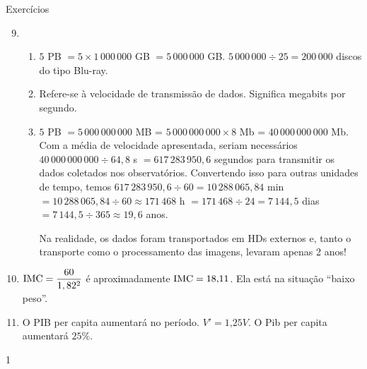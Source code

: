 \begin{answer}{Exercícios}
{\exerciselist
\begin{enumerate}\setcounter{enumi}{8}
\item 
\begin{enumerate}
\item \(5\) PB \(= 5\times 1\,000\,000\) GB \(= 5\,000\,000\) GB. \(5\,000\,000 \div 25 = 200\,000\) discos do tipo Blu-ray.

\item Refere-se à velocidade de transmissão de dados. Significa megabits por segundo.

\item \(5\) PB \(=5\,000\,000\,000\) MB = \(5\,000\,000\,000 \times 8\) Mb = \(40\,000\,000\,000\) Mb. Com a média de velocidade apresentada, seriam necessários \(40\,000\,000\,000 \div 64,8\) s \(= 617\,283\,950,6\) segundos para transmitir os dados coletados nos observatórios. Convertendo isso para outras unidades de tempo, temos \(617\,283\,950,6 \div 60 = 10\,288\,065,84\) min \(= 10\,288\,065,84 \div 60 \approx 171\,468\) h \(= 171\,468 \div 24 = 7\,144,5\) dias \(= 7\,144,5 \div 365 \approx 19,6\) anos.

Na realidade, os dados foram transportados em HDs externos e, tanto o transporte como o processamento das imagens, levaram apenas 2 anos!
\end{enumerate}

\item \({\rm IMC}=\dfrac{60}{1,82^2}\) é aproximadamente \({\rm IMC} = 18\text{,}11\). Ela está na situação “baixo peso”.

\item O PIB per capita aumentará no período.  \(V'=1\text{,}25V\). O Pib per capita aumentará \(25\%\).
\end{enumerate}
}{1}
\end{answer}
\clearmargin

